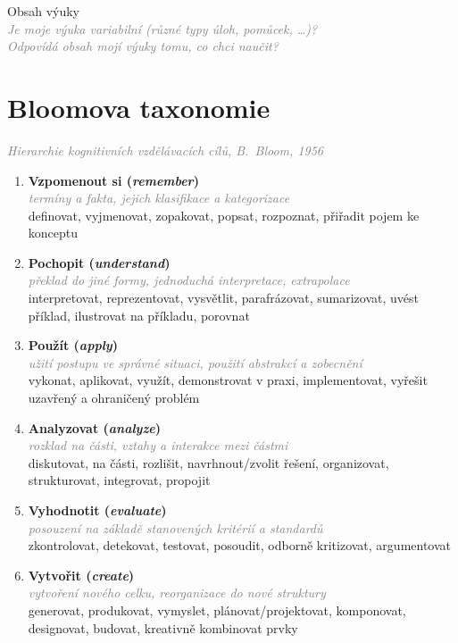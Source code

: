 \documentclass[twoside,openany]{book}
\newcommand{\note}[1]{\textcolor{gray}{\small\itshape #1}}
\begin{document}
Obsah výuky\\
\note{Je moje výuka variabilní (různé typy úloh, pomůcek, \dots)?\\
Odpovídá obsah mojí výuky tomu, co chci naučit?}

\newpage

\chapter*{Bloomova taxonomie}
\label{bloom}
\vspace{-0.5em}
\note{Hierarchie kognitivních vzdělávacích cílů, B.\ Bloom, 1956}
\vspace{-0.3em}

\begin{enumerate}[leftmargin=*]
\item \textbf{Vzpomenout si (\textit{remember})}\\
\note{termíny a fakta, jejich klasifikace a kategorizace}\\
{\small definovat, vyjmenovat, zopakovat, popsat, rozpoznat, přiřadit pojem ke konceptu}

\item \textbf{Pochopit (\textit{understand})}\\
\note{překlad do jiné formy, jednoduchá interpretace, extrapolace}\\
{\small interpretovat, reprezentovat, vysvětlit, parafrázovat, sumarizovat, uvést příklad, ilustrovat na příkladu, porovnat}

\item \textbf{Použít (\textit{apply})}\\
\note{užití postupu ve správné situaci, použití abstrakcí a zobecnění}\\
{\small vykonat, aplikovat, využít, demonstrovat v praxi, implementovat, vyřešit uzavřený a ohraničený problém}

\item \textbf{Analyzovat (\textit{analyze})}\\
\note{rozklad na části, vztahy a interakce mezi částmi}\\
{\small diskutovat,  na části, rozlišit, navrhnout/zvolit řešení, organizovat, strukturovat, integrovat, propojit}

\item \textbf{Vyhodnotit (\textit{evaluate})}\\
\note{posouzení na základě stanovených kritérií a standardů}\\
{\small zkontrolovat, detekovat, testovat, posoudit, odborně kritizovat, argumentovat}

\item \textbf{Vytvořit (\textit{create})}\\
\note{vytvoření nového celku, reorganizace do nové struktury}\\
{\small generovat, produkovat, vymyslet, plánovat/projektovat, komponovat, designovat, budovat, kreativně kombinovat prvky}
\end{enumerate}
\end{document}
